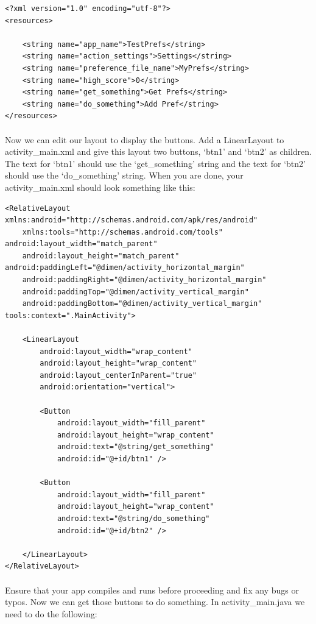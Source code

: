 \documentclass[12pt, a4paper, twoside]{book}
\begin{document}
\begin{lstlisting}
<?xml version="1.0" encoding="utf-8"?>
<resources>

    <string name="app_name">TestPrefs</string>
    <string name="action_settings">Settings</string>
    <string name="preference_file_name">MyPrefs</string>
    <string name="high_score">0</string>
    <string name="get_something">Get Prefs</string>
    <string name="do_something">Add Pref</string>
</resources>
\end{lstlisting}

\paragraph{} Now we can edit our layout to display the buttons. Add a LinearLayout to activity\_main.xml and give this layout two buttons, `btn1' and `btn2' as children. The text for `btn1' should use the `get\_something' string and the text for `btn2' should use the `do\_something' string. When you are done, your activity\_main.xml should look something like this:

\begin{lstlisting}
<RelativeLayout xmlns:android="http://schemas.android.com/apk/res/android"
    xmlns:tools="http://schemas.android.com/tools" android:layout_width="match_parent"
    android:layout_height="match_parent" android:paddingLeft="@dimen/activity_horizontal_margin"
    android:paddingRight="@dimen/activity_horizontal_margin"
    android:paddingTop="@dimen/activity_vertical_margin"
    android:paddingBottom="@dimen/activity_vertical_margin" tools:context=".MainActivity">

    <LinearLayout
        android:layout_width="wrap_content"
        android:layout_height="wrap_content"
        android:layout_centerInParent="true"
        android:orientation="vertical">

        <Button
            android:layout_width="fill_parent"
            android:layout_height="wrap_content"
            android:text="@string/get_something"
            android:id="@+id/btn1" />

        <Button
            android:layout_width="fill_parent"
            android:layout_height="wrap_content"
            android:text="@string/do_something"
            android:id="@+id/btn2" />

    </LinearLayout>
</RelativeLayout>
\end{lstlisting}

\paragraph{} Ensure that your app compiles and runs before proceeding and fix any bugs or typos. Now we can get those buttons to do something. In activity\_main.java we need to do the following:
\end{document}
